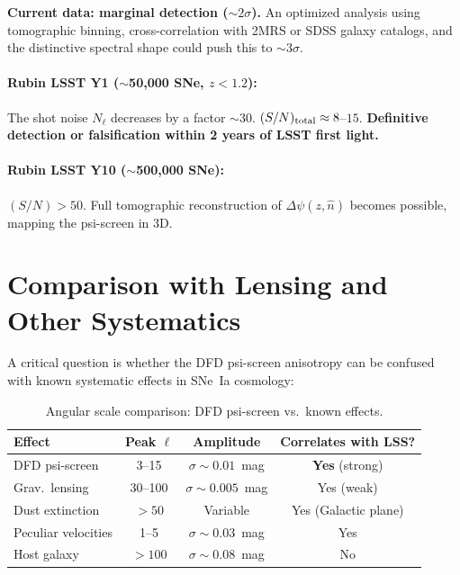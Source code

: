 \documentclass[11pt,a4paper]{article}
\newcounter{findingctr}
\newenvironment{finding}[1][]{%
  \refstepcounter{findingctr}%
  \begin{tcolorbox}[colback=blue!3!white, colframe=blue!50!black,
    title=\textbf{Finding \thefindingctr: #1}]
}{%
  \end{tcolorbox}%
}
\newcommand{\Dpsi}{\Delta\psi}
\begin{document}
\begin{finding}[\textbf{DECISIVE}: SNe~Ia $\psi$-Screen Anisotropy ---
  Precise Angular Power Spectrum]
\textbf{Current data: marginal detection ($\sim 2\sigma$).}
An optimized analysis using tomographic binning, cross-correlation
with 2MRS or SDSS galaxy catalogs, and the distinctive spectral
shape could push this to $\sim 3\sigma$.

\paragraph{Rubin LSST Y1 ($\sim$50,000 SNe, $z < 1.2$):}
The shot noise $N_\ell$ decreases by a factor $\sim$30.
$(S/N)_{\rm total} \approx 8$--$15$.
\textbf{Definitive detection or falsification within 2 years of LSST
first light.}

\paragraph{Rubin LSST Y10 ($\sim$500,000 SNe):}
$(S/N) > 50$.  Full tomographic reconstruction of $\Dpsi(z, \hat{n})$
becomes possible, mapping the psi-screen in 3D.

\end{finding}


\section{Comparison with Lensing and Other Systematics}

A critical question is whether the DFD psi-screen anisotropy can be
confused with known systematic effects in SNe~Ia cosmology:

\begin{table}[H]
\centering
\caption{Angular scale comparison: DFD psi-screen vs.\ known effects.}
\label{tab:confusion}
\begin{tabular}{lccc}
\toprule
\textbf{Effect} & \textbf{Peak $\ell$} & \textbf{Amplitude} &
\textbf{Correlates with LSS?} \\
\midrule
DFD psi-screen & 3--15 & $\sigma \sim 0.01$~mag & \textbf{Yes} (strong) \\
Grav.\ lensing & 30--100 & $\sigma \sim 0.005$~mag & Yes (weak) \\
Dust extinction & $>50$ & Variable & Yes (Galactic plane) \\
Peculiar velocities & 1--5 & $\sigma \sim 0.03$~mag & Yes \\
Host galaxy & $>100$ & $\sigma \sim 0.08$~mag & No \\
\bottomrule
\end{tabular}
\end{table}
\end{document}
